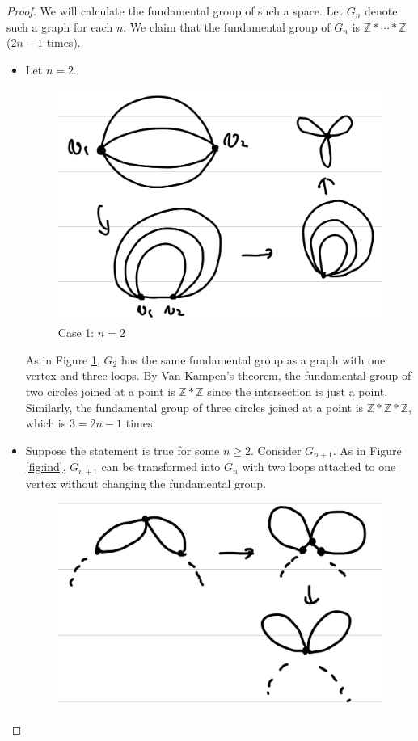 \documentclass[12pt, psamsfonts]{amsart}
\theoremstyle{definition}
\theoremstyle{remark}
\numberwithin{equation}{section}
\begin{document}
\begin{proof}
  We will calculate the fundamental group of such a space.
  Let $G_n$ denote such a graph for each $n$.
  We claim that the fundamental group of $G_n$ is $\mathbb{Z} * \cdots * \mathbb{Z}$ ($2n - 1$ times).
  \begin{itemize}
    \item
      Let $n = 2$.
      \begin{figure}
        \includegraphics[width=\linewidth]{base_case.jpeg}
          \caption{Case 1: $n = 2$}
        \label{fig:n2}
      \end{figure}
      As in Figure \ref{fig:n2}, $G_2$ has the same fundamental group as a graph with one vertex and three loops.
      By Van Kampen's theorem, the fundamental group of two circles joined at a point is $\mathbb{Z} * \mathbb{Z}$ since the intersection is just a point.
      Similarly, the fundamental group of three circles joined at a point is $\mathbb{Z} * \mathbb{Z} * \mathbb{Z}$, which is $3 = 2n - 1$ times.
    \item
      Suppose the statement is true for some $n \geq 2$.
      Consider $G_{n + 1}$.
      As in Figure \ref{fig:ind}, $G_{n + 1}$ can be transformed into $G_{n}$ with two loops attached to one vertex without changing the fundamental group.
      \begin{figure}
        \includegraphics[width=\linewidth]{induction.jpeg}

\end{figure}
\end{itemize}
\end{proof}
\end{document}
